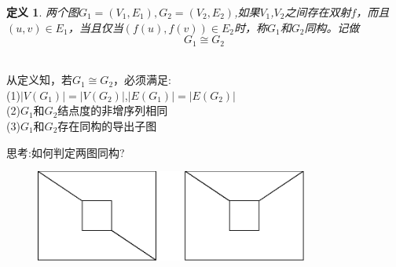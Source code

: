 \documentclass[11pt,a4paper,openany]{book}
\newcommand{\hwxw}{\CJKfamily{hwxw}}
\newcommand{\xiaosihao}{\fontsize{12pt}{\baselineskip}\selectfont}  %
\newtheorem{defination}{\textbf{定义}}[section]
\begin{document}
\begin{defination}
两个图$G_1=(V_1,E_1),G_2=(V_2,E_2)$,如果$V_1$,$V_2$之间存在双射$f$，而且$(u,v)\in E_1$，当且仅当$(f(u),f(v))\in E_2$时，称$G_1$和$G_2$\textcolor[rgb]{1.00,0.00,0.00}{同构}。记做$$G_1\cong G_2$$\\
\end{defination}
\begin{shaded}
\noindent 从定义知，若$G_1\cong G_2$，必须满足:\\
(1)$|V(G_1)|=|V(G_2)|$,$|E(G_1)|=|E(G_2)|$\\
(2)$G_1$和$G_2$结点度的非增序列相同\\
(3)$G_1$和$G_2$存在同构的导出子图\\
\end{shaded}
{\xiaosihao\hwxw 思考:如何判定两图同构?}\\
\begin{figure}[H]
  \centering
  \includegraphics[width=0.8\textwidth]{tonggou.eps}\\
  \caption*{}
\end{figure}
\end{document}
